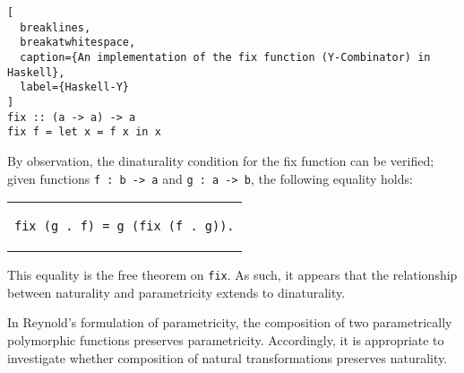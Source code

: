 \documentclass[../../Dissertation.tex]{subfiles}
\begin{document}
\begin{lstlisting}[
  breaklines,
  breakatwhitespace,
  caption={An implementation of the fix function (Y-Combinator) in Haskell},
  label={Haskell-Y}
]
fix :: (a -> a) -> a
fix f = let x = f x in x
\end{lstlisting}
By observation, the dinaturality condition for the fix function can be verified; given functions \lstinline{f : b -> a} and \lstinline{g : a -> b}, the following equality holds:
\begin{center}
\begin{tabular}{c}
\begin{lstlisting}
fix (g . f) = g (fix (f . g)).
\end{lstlisting}
\end{tabular}
\end{center}
This equality is the free theorem on \lstinline{fix}. As such, it appears that the relationship between naturality and parametricity extends to dinaturality.
\par 
In Reynold's formulation of parametricity, the composition of two parametrically polymorphic functions preserves parametricity. Accordingly, it is appropriate to investigate whether composition of natural transformations preserves naturality.
\end{document}
